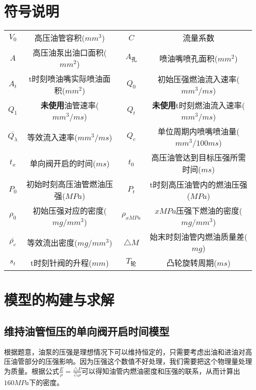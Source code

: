 \documentclass{cumcmthesis}
\begin{document}
\section{符号说明}
\begin{center}
	\begin{tabular}{cc|cc}
		\toprule
		\makebox[0.05\textwidth][c]{符号}	&  \makebox[0.2\textwidth][c]{意义}  & \makebox[0.05\textwidth][c]{符号}	&  \makebox[0.2\textwidth][c]{意义} \\
		\midrule
		$V_{0}$	  & 高压油管容积($mm^{3}$)& 
		$C$       & 流量系数\\
		$A$       & 高压油泵出油口面积($mm^{2}$)&
		$A_{\text{孔}}$       & 喷油嘴喷孔面积($mm^{2}$)\\
		$A_{t}$       & t时刻喷油嘴实际喷油面积($mm^{2}$)&
		$Q_{0}$   & 初始压强燃油流入速率($mm^{3}/ms$)\\
		$Q_{1}$   & \textbf{未使用}油管速率($mm^{3}/ms$)&
		$Q_{t}$   & \textbf{未使用}t时刻燃油流入速率($mm^{3}/ms$)\\
		$\overline{Q_{\lambda}}$    & 等效流入速率($mm^{3}/ms$)&
		$Q_{c}$   & 单位周期内喷嘴喷油量($mm^{3}/100ms$)\\
		$t_{x}$   & 单向阀开启的时间($ms$)&
		$t_{0}$   & 高压油管达到目标压强所需时间($ms$)\\
		$P_{0}$   & 初始时刻高压油管燃油压强($MPa$)&
		$P_{t}$   & t时刻高压油管内的燃油压强($MPa$)\\
		$\rho_{0}$   & 初始压强对应的密度($mg/mm^{3}$)&
		$\rho_{xMPa}$   & $xMPa$压强下燃油的密度($mg/mm^{3}$)\\
		$\overline{\rho_{c}}$   & 等效流出密度($mg/mm^{3}$)&
		${\triangle M}$   & 始末时刻油管内燃油质量差($mg$)\\
		$s_{t}$   & t时刻针阀的升程($mm$)&
		${T_{\text{轮}}}$   & 凸轮旋转周期($ms$)\\
		
		\bottomrule
	\end{tabular}
\end{center}
\section{模型的构建与求解}
\subsection{维持油管恒压的单向阀开启时间模型}
根据题意，油泵的压强是理想情况下可以维持恒定的，只需要考虑出油和进油对高压油管部分的压强影响。因为压强这个数值不好处理，我们需要把这个物理量处理为质量。根据公式$\frac{E}{\rho} = \frac{\triangle P}{\triangle \rho}$可以得知油管内燃油密度和压强的联系，从而计算出$160MPa$下的密度。
\end{document}
